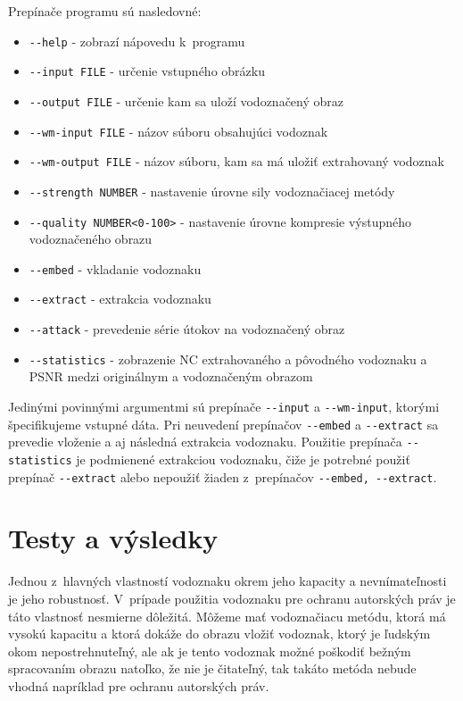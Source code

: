 Prepínače programu sú nasledovné:
\begin{itemize}
\item {\verb|--help|} - zobrazí nápovedu k~programu
\item {\verb|--input FILE|} - určenie vstupného obrázku
\item {\verb|--output FILE|} - určenie kam sa uloží vodoznačený obraz
\item {\verb|--wm-input FILE|} - názov súboru obsahujúci vodoznak
\item {\verb|--wm-output FILE|} - názov súboru, kam sa má uložiť extrahovaný vodoznak
\item {\verb|--strength NUMBER|} - nastavenie úrovne sily vodoznačiacej metódy
\item {\verb|--quality NUMBER<0-100>|} - nastavenie úrovne kompresie výstupného vodoznačeného obrazu
\item {\verb|--embed|} - vkladanie vodoznaku
\item {\verb|--extract|} - extrakcia vodoznaku
\item {\verb|--attack|} - prevedenie série útokov na vodoznačený obraz
\item {\verb|--statistics|} - zobrazenie NC extrahovaného a pôvodného vodoznaku a PSNR medzi originálnym a vodoznačeným obrazom 
\end{itemize}

Jedinými povinnými argumentmi sú prepínače \verb|--input| a \verb|--wm-input|, ktorými špecifikujeme vstupné dáta. Pri neuvedení prepínačov \verb|--embed| a \verb|--extract| sa prevedie vloženie a aj následná extrakcia vodoznaku. Použitie prepínača \verb|--statistics| je podmienené extrakciou vodoznaku, čiže je potrebné použiť prepínač \verb|--extract| alebo nepoužiť žiaden z~prepínačov \verb|--embed, --extract|.


\chapter{Testy a výsledky} \label{testy}
Jednou z~hlavných vlastností vodoznaku okrem jeho kapacity a nevnímateľnosti je jeho robustnosť. V~prípade použitia vodoznaku pre ochranu autorských práv je táto vlastnosť nesmierne dôležitá. Môžeme mať vodoznačiacu metódu, ktorá má vysokú kapacitu a ktorá dokáže do obrazu vložiť vodoznak, ktorý je ľudským okom nepostrehnuteľný, ale ak je tento vodoznak možné poškodiť bežným spracovaním obrazu natoľko, že nie je čitateľný, tak takáto metóda nebude vhodná napríklad pre ochranu autorských práv.

